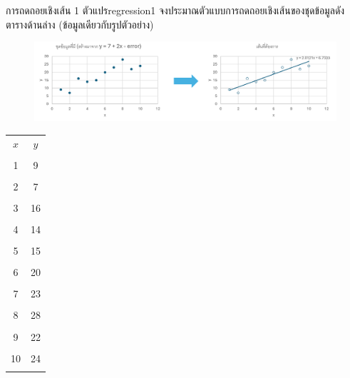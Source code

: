 \newpage
\begin{example}
    {การถดถอยเชิงเส้น 1 ตัวแปร}{regression1}
    จงประมาณตัวแบบการถดถอยเชิงเส้นของชุดข้อมูลดังตารางด้านล่าง (ข้อมูลเดียวกับรูปตัวอย่าง)
\end{example}
\begin{figure}[h]
    \centering
    \includegraphics[width=1\linewidth]{regressionSample.png}
\end{figure}
\begin{tabular}{|c|c|}
    \hline
    $x$ & $y$ \\[0.05em] & \\ \hline
    1     & 9   \\[0.05em] & \\ \hline
    2     & 7    \\[0.05em] & \\ \hline
    3     & 16    \\[0.05em] & \\ \hline
    4     & 14   \\[0.05em] & \\ \hline
    5     & 15   \\[0.05em] & \\ \hline
    6     & 20   \\[0.05em] & \\ \hline
    7     & 23  \\[0.05em] &  \\ \hline
    8     & 28  \\[0.05em] &  \\ \hline
    9     & 22   \\[0.05em] & \\ \hline
    10    & 24   \\[0.05em] & \\ \hline
\end{tabular}\\


